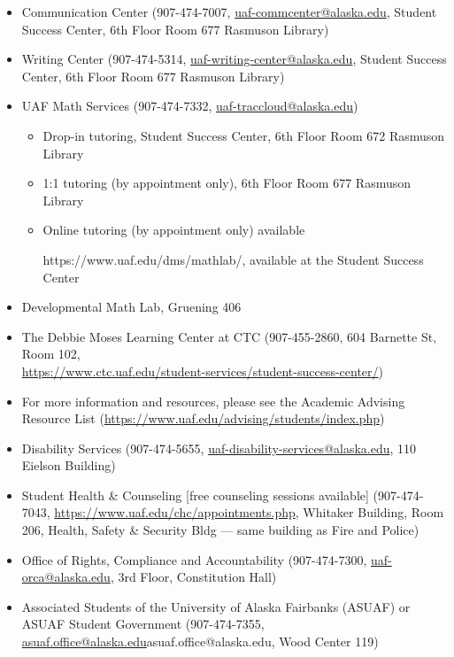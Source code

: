 \documentclass[12pt]{article}
\def\mailto#1{\href{mailto:#1}{#1}}
\begin{document}
\begin{itemize}
\setlength\itemsep{0em}
        \item Communication Center (907-474-7007, \mailto{uaf-commcenter@alaska.edu}, Student Success Center, 6th Floor Room 677 Rasmuson Library)
        \item Writing Center (907-474-5314, \mailto{uaf-writing-center@alaska.edu}, Student Success Center, 6th Floor Room 677 Rasmuson Library)
\item UAF Math Services (907-474-7332, \mailto{uaf-traccloud@alaska.edu})


\begin{itemize}
\item Drop-in tutoring, Student Success Center, 6th Floor Room 672 Rasmuson Library

\item 1:1 tutoring (by appointment only), 6th Floor Room 677 Rasmuson Library

\item Online tutoring (by appointment only) available

https://www.uaf.edu/dms/mathlab/, available at the Student Success Center
\end{itemize}

\item Developmental Math Lab, Gruening 406
\item The Debbie Moses Learning Center at CTC (907-455-2860, 604 Barnette St, Room 102,\\ \url{https://www.ctc.uaf.edu/student-services/student-success-center/})
\item For more information and resources, please see the Academic Advising Resource List (\url{https://www.uaf.edu/advising/students/index.php})
\end{itemize}

\begin{itemize}
\setlength\itemsep{0em}
\item Disability Services (907-474-5655, \mailto{uaf-disability-services@alaska.edu}, 110 Eielson Building)
\item Student Health \& Counseling [free counseling sessions available] (907-474-7043, \url{https://www.uaf.edu/chc/appointments.php}, Whitaker Building, Room 206, Health, Safety \& Security Bldg --- same building as Fire and Police)
\item Office of Rights, Compliance and Accountability (907-474-7300, \mailto{uaf-orca@alaska.edu}, 3rd Floor, Constitution Hall)
\item Associated Students of the University of Alaska Fairbanks (ASUAF) or ASUAF Student Government (907-474-7355, \mailto{asuaf.office@alaska.edu}{asuaf.office@alaska.edu}, Wood Center 119)
\end{itemize}
\end{document}
